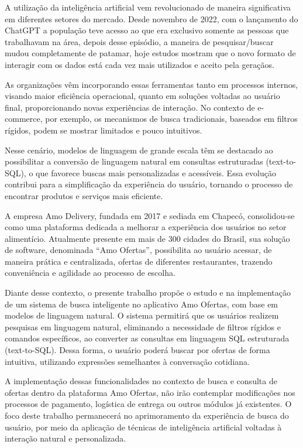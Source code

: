 \label{cap:introducao}

A utilização da inteligência artificial  vem revolucionado de maneira significativa em diferentes setores do mercado. Desde novembro de 2022, com o lançamento
do ChatGPT a população teve acesso ao que era exclusivo somente as pessoas que trabalhavam na área, depois desse episódio, a maneira de pesquisar/buscar mudou completamente de 
patamar, hoje estudos mostram que o novo formato de interagir com os dados está cada vez mais utilizados e aceito pela geraçãos. 

As organizações vêm incorporando essas ferramentas tanto em processos internos, 
visando maior eficiência operacional, quanto em soluções voltadas ao usuário final, proporcionando novas experiências de interação.
No contexto de e-commerce, por exemplo, os mecanismos de busca tradicionais, baseados em filtros rígidos, podem se mostrar limitados e pouco intuitivos.

Nesse cenário, modelos de linguagem de grande escala  têm se destacado ao possibilitar a conversão de linguagem natural em consultas estruturadas (text-to-SQL), 
o que favorece buscas mais personalizadas e acessíveis. Essa evolução contribui para a simplificação da experiência do usuário, tornando o processo de encontrar produtos e serviços mais eficiente. 

A empresa Amo Delivery, fundada em 2017 e sediada em Chapecó, consolidou-se como uma plataforma dedicada a melhorar a experiência dos usuários no setor alimentício. 
Atualmente presente em mais de 300 cidades do Brasil, sua solução de software, denominada “Amo Ofertas”, possibilita ao usuário acessar, de maneira prática e centralizada, 
ofertas de diferentes restaurantes, trazendo conveniência e agilidade ao processo de escolha.

Diante desse contexto, o presente trabalho propõe o estudo e na implementação de um sistema de busca inteligente no aplicativo Amo Ofertas, com base em modelos de linguagem natural. 
O sistema permitirá que os usuários realizem pesquisas em linguagem natural, eliminando a necessidade de filtros rígidos e comandos específicos, ao converter as consultas em 
linguagem SQL estruturada (text-to-SQL). Dessa forma, o usuário poderá buscar por ofertas de forma intuitiva, utilizando expressões semelhantes à conversação cotidiana.

A implementação dessas funcionalidades no contexto de busca e consulta de ofertas dentro da plataforma Amo Ofertas, 
não irão contemplar modificações nos processos de pagamento, logística de entrega ou outros módulos já existentes. O foco deste trabalho 
permanecerá no aprimoramento da experiência de busca do usuário, por meio da aplicação de técnicas de 
inteligência artificial voltadas à interação natural e personalizada.


